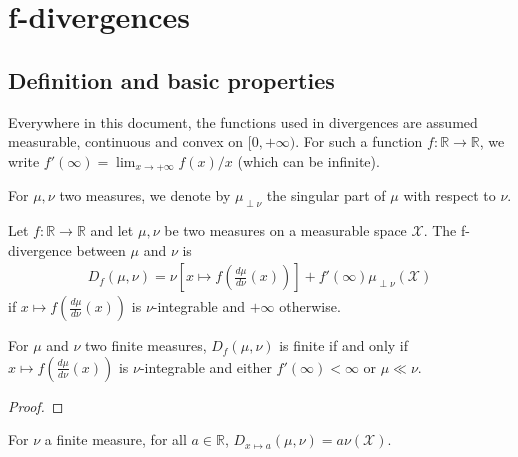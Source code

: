 \section{f-divergences}

\subsection{Definition and basic properties}

Everywhere in this document, the functions used in divergences are assumed measurable, continuous and convex on $[0, +\infty)$.
For such a function $f : \mathbb{R} \to \mathbb{R}$, we write $f'(\infty) = \lim_{x \to +\infty} f(x)/x$ (which can be infinite).

For $\mu, \nu$ two measures, we denote by $\mu_{\perp \nu}$ the singular part of $\mu$ with respect to $\nu$.

\begin{definition}[f-divergence]
  \label{def:fDiv}
  \leanok
  Let $f : \mathbb{R} \to \mathbb{R}$ and let $\mu, \nu$ be two measures on a measurable space $\mathcal X$. The f-divergence between $\mu$ and $\nu$ is
  \begin{align*}
  D_f(\mu, \nu) = \nu\left[x \mapsto f\left(\frac{d \mu}{d \nu}(x)\right)\right] + f'(\infty) \mu_{\perp \nu}(\mathcal X)
  \end{align*}
  if $x \mapsto f\left(\frac{d \mu}{d \nu}(x)\right)$ is $\nu$-integrable and $+\infty$ otherwise.
\end{definition}

\begin{lemma}
  \label{lem:fDiv_ne_top_iff}
  \leanok
  For $\mu$ and $\nu$ two finite measures, $D_f(\mu, \nu)$ is finite if and only if $x \mapsto f\left(\frac{d \mu}{d \nu}(x)\right)$ is $\nu$-integrable and either $f'(\infty) < \infty$ or $\mu \ll \nu$.
\end{lemma}

\begin{proof}\leanok
\end{proof}

\begin{lemma}
  \label{lem:fDiv_const}
  \leanok
  For $\nu$ a finite measure, for all $a \in \mathbb{R}$, $D_{x \mapsto a}(\mu, \nu) = a \nu(\mathcal X)$.
\end{lemma}

